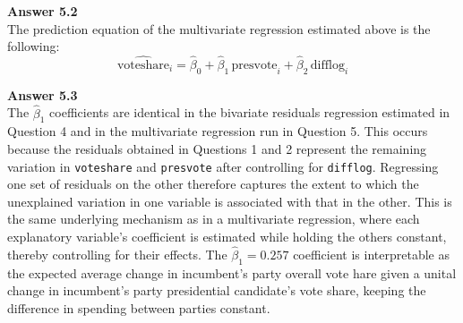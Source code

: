 \documentclass[12pt,letterpaper]{article}
\begin{document}
\vspace{1cm}
\noindent\textbf{Answer 5.2}\\

\vspace{0.5cm}
\noindent The prediction equation of the multivariate regression estimated above is the following: 
\[
\widehat{\text{voteshare}}_i = \hat{\beta}_0 + \hat{\beta}_1 \, \text{presvote}_i + \hat{\beta}_2 \, \text{difflog}_i
\]

\vspace{1cm}
\noindent\textbf{Answer 5.3}\\

\vspace{0.5cm}
\noindent The $\hat{\beta}_1$ coefficients are identical in the bivariate residuals regression estimated in Question 4 and in the multivariate regression run in Question 5. This occurs because the residuals obtained in Questions 1 and 2 represent the remaining variation in \texttt{voteshare} and \texttt{presvote} after controlling for \texttt{difflog}. Regressing one set of residuals on the other therefore captures the extent to which the unexplained variation in one variable is associated with that in the other. This is the same underlying mechanism as in a multivariate regression, where each explanatory variable’s coefficient is estimated while holding the others constant, thereby controlling for their effects.
\noindent The $\hat{\beta}_1 = 0.257$ coefficient is interpretable as the expected average change in incumbent's party overall vote  hare given a unital change in incumbent's party presidential candidate's vote share, keeping the difference in spending between parties constant. 
\end{document}
